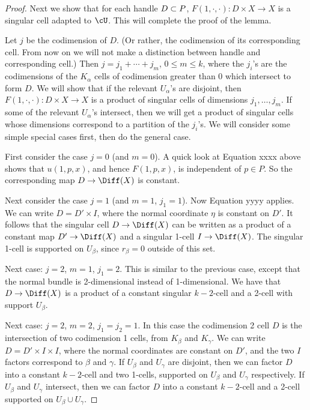 \begin{proof}
\medskip

Next we show that for each handle $D \subset P$, $F(1, \cdot, \cdot) : D\times X \to X$
is a singular cell adapted to $\cU$.
This will complete the proof of the lemma.

Let $j$ be the codimension of $D$.
(Or rather, the codimension of its corresponding cell.  From now on we will not make a distinction
between handle and corresponding cell.)
Then $j = j_1 + \cdots + j_m$, $0 \le m \le k$,
where the $j_i$'s are the codimensions of the $K_\alpha$
cells of codimension greater than 0 which intersect to form $D$.
We will show that
if the relevant $U_\alpha$'s are disjoint, then
$F(1, \cdot, \cdot) : D\times X \to X$
is a product of singular cells of dimensions $j_1, \ldots, j_m$.
If some of the relevant $U_\alpha$'s intersect, then we will get a product of singular
cells whose dimensions correspond to a partition of the $j_i$'s.
We will consider some simple special cases first, then do the general case.

First consider the case $j=0$ (and $m=0$).
A quick look at Equation xxxx above shows that $u(1, p, x)$, and hence $F(1, p, x)$,
is independent of $p \in P$.
So the corresponding map $D \to \Diff(X)$ is constant.

Next consider the case $j = 1$ (and $m=1$, $j_1=1$).
Now Equation yyyy applies.
We can write $D = D'\times I$, where the normal coordinate $\eta$ is constant on $D'$.
It follows that the singular cell $D \to \Diff(X)$ can be written as a product
of a constant map $D' \to \Diff(X)$ and a singular 1-cell $I \to \Diff(X)$.
The singular 1-cell is supported on $U_\beta$, since $r_\beta = 0$ outside of this set.

Next case: $j=2$, $m=1$, $j_1 = 2$.
This is similar to the previous case, except that the normal bundle is 2-dimensional instead of
1-dimensional.
We have that $D \to \Diff(X)$ is a product of a constant singular $k{-}2$-cell
and a 2-cell with support $U_\beta$.

Next case: $j=2$, $m=2$, $j_1 = j_2 = 1$.
In this case the codimension 2 cell $D$ is the intersection of two
codimension 1 cells, from $K_\beta$ and $K_\gamma$.
We can write $D = D' \times I \times I$, where the normal coordinates are constant
on $D'$, and the two $I$ factors correspond to $\beta$ and $\gamma$.
If $U_\beta$ and $U_\gamma$ are disjoint, then we can factor $D$ into a constant $k{-}2$-cell and
two 1-cells, supported on $U_\beta$ and $U_\gamma$ respectively.
If $U_\beta$ and $U_\gamma$ intersect, then we can factor $D$ into a constant $k{-}2$-cell and
a 2-cell supported on $U_\beta \cup U_\gamma$.



\end{proof}




